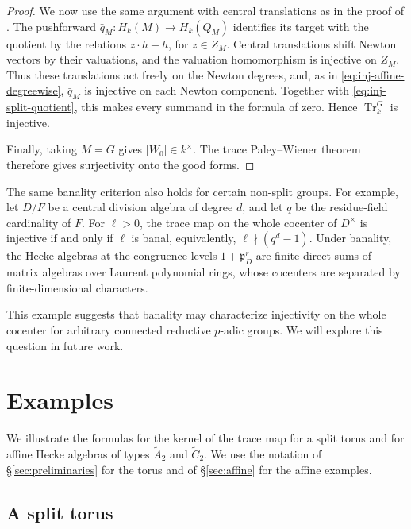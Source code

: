 \documentclass[11pt,letterpaper]{amsart}
\theoremstyle{definition}
\numberwithin{equation}{section}
\numberwithin{theorem}{section}
\newcommand{\kk}{k}
\DeclareMathOperator{\Tr}{Tr}
\begin{document}
\begin{proof}
We now use the same argument with central
translations as in the proof of
.
The pushforward
$\bar q_M:\bar H_\kk(M)\to\bar H_\kk(Q_M)$
identifies its target with the quotient by the
relations $z\cdot h-h$, for $z\in Z_M$.
Central translations shift Newton vectors by
their valuations, and the valuation homomorphism
is injective on $Z_M$.
Thus these translations act freely on the Newton
degrees, and, as in
\eqref{eq:inj-affine-degreewise}, $\bar q_M$
is injective on each Newton component.
Together with \eqref{eq:inj-split-quotient},
this makes every summand in the formula of
 zero.
Hence $\Tr_\kk^G$ is injective.

Finally, taking $M=G$ gives $|W_0|\in\kk^\times$.
The trace Paley--Wiener theorem
 therefore gives surjectivity
onto the good forms.
\end{proof}

The same banality criterion also holds for certain
non-split groups.
For example, let $D/F$ be a central division algebra
of degree $d$, and let $q$ be the residue-field
cardinality of $F$.
For $\ell>0$, the trace map on the whole cocenter of $D^\times$ is injective if and only if $\ell$ is banal,
equivalently, $\ell\nmid(q^d-1)$.
Under banality, the Hecke algebras at the congruence
levels $1+\mathfrak p_D^r$ are finite direct sums
of matrix algebras over Laurent polynomial rings,
whose cocenters are separated by finite-dimensional
characters.

This example suggests that banality may characterize
injectivity on the whole cocenter for arbitrary
connected reductive $p$-adic groups.
We will explore this question in future work.

\section{Examples}

\label{sec:examples}

We illustrate the formulas for the kernel of the trace map for a split torus and for affine Hecke algebras of types $\widetilde A_2$ and $\widetilde C_2$. We use the notation of \S\ref{sec:preliminaries} for the torus and of \S\ref{sec:affine} for the affine examples.

\subsection{A split torus}
\label{subsec:torus-example}
\end{document}
